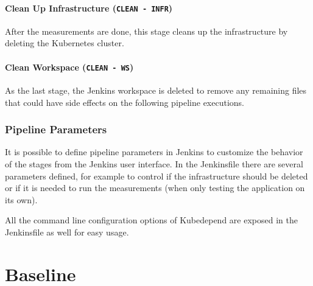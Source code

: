 \paragraph{Clean Up Infrastructure (\texttt{CLEAN - INFR})} After the measurements are done, this stage cleans up the infrastructure by deleting the Kubernetes cluster.

\paragraph{Clean Workspace (\texttt{CLEAN - WS})} As the last stage, the Jenkins workspace is deleted to remove any remaining files that could have side effects on the following pipeline executions.

\subsubsection{Pipeline Parameters}

It is possible to define pipeline parameters in Jenkins to customize the behavior of the stages from the Jenkins user interface. In the Jenkinsfile there are several parameters defined, for example to control if the infrastructure should be deleted or if it is needed to run the measurements (\eg when only testing the application on its own).

All the command line configuration options of Kubedepend are exposed in the Jenkinsfile as well for easy usage.


\section{Baseline}



